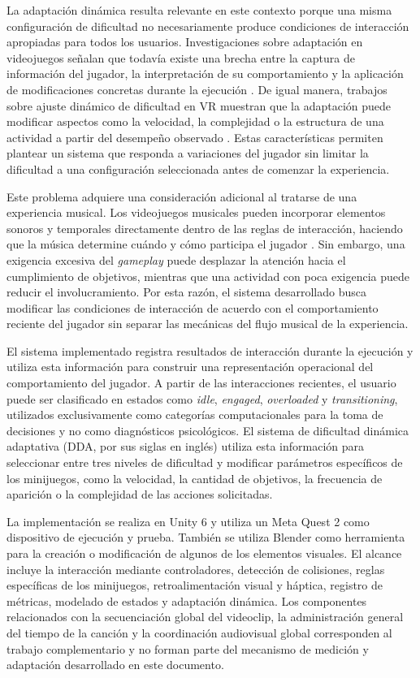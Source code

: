 La adaptación dinámica resulta relevante en este contexto porque una 
misma configuración de dificultad no necesariamente produce condiciones 
de interacción apropiadas para todos los usuarios. Investigaciones sobre 
adaptación en videojuegos señalan que todavía existe una brecha entre la 
captura de información del jugador, la interpretación de su 
comportamiento y la aplicación de modificaciones concretas durante la 
ejecución \cite{lopes2025closing}. De igual manera, trabajos sobre 
ajuste dinámico de dificultad en VR muestran que la adaptación puede 
modificar aspectos como la velocidad, la complejidad o la estructura de 
una actividad a partir del desempeño observado \cite{huber2021dda}. 
Estas características permiten plantear un sistema que responda a 
variaciones del jugador sin limitar la dificultad a una configuración 
seleccionada antes de comenzar la experiencia.

Este problema adquiere una consideración adicional al tratarse de una 
experiencia musical. Los videojuegos musicales pueden incorporar 
elementos sonoros y temporales directamente dentro de las reglas de 
interacción, haciendo que la música determine cuándo y cómo participa el 
jugador \cite{pichlmair2007sound}. Sin embargo, una exigencia excesiva 
del \textit{gameplay} puede desplazar la atención hacia el cumplimiento 
de objetivos, mientras que una actividad con poca exigencia puede reducir 
el involucramiento. Por esta razón, el sistema desarrollado busca 
modificar las condiciones de interacción de acuerdo con el 
comportamiento reciente del jugador sin separar las mecánicas del flujo 
musical de la experiencia.

El sistema implementado registra resultados de interacción durante la 
ejecución y utiliza esta información para construir una representación 
operacional del comportamiento del jugador. A partir de las 
interacciones recientes, el usuario puede ser clasificado en estados 
como \textit{idle}, \textit{engaged}, \textit{overloaded} y 
\textit{transitioning}, utilizados exclusivamente como categorías 
computacionales para la toma de decisiones y no como diagnósticos 
psicológicos. El sistema de dificultad dinámica adaptativa 
(DDA, por sus siglas en inglés) utiliza esta información para 
seleccionar entre tres niveles de dificultad y modificar parámetros 
específicos de los minijuegos, como la velocidad, la cantidad de 
objetivos, la frecuencia de aparición o la complejidad de las acciones 
solicitadas.

La implementación se realiza en Unity 6 y utiliza un Meta Quest 2 como 
dispositivo de ejecución y prueba. También se utiliza Blender como herramienta
para la creación o modificación de algunos de los elementos visuales.
El alcance incluye la interacción mediante controladores, detección de 
colisiones, reglas específicas de los minijuegos, retroalimentación 
visual y háptica, registro de métricas, modelado de estados y adaptación 
dinámica. Los componentes relacionados con la secuenciación global del 
videoclip, la administración general del tiempo de la canción y la 
coordinación audiovisual global corresponden al trabajo complementario y 
no forman parte del mecanismo de medición y adaptación desarrollado en 
este documento.

